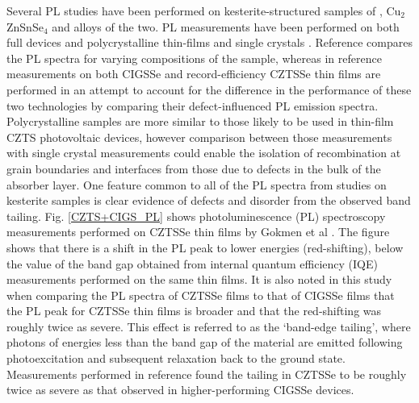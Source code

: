 \documentclass[11pt, twoside]{report}
\begin{document}
Several PL studies have been performed on kesterite-structured samples of {\CZTS}, Cu$_2$ZnSnSe$_4$ and alloys of the two. PL measurements have been performed on both full devices and polycrystalline thin-films \cite{band_tail, Gershon, Gershon_ref18, Romero, Miyamoto, Unold} and single crystals \cite{Halliday, Levcenko, Hones}. Reference  compares the PL spectra for varying compositions of the sample, whereas in reference  measurements on both CIGSSe and record-efficiency CZTSSe thin films are performed in an attempt to account for the difference in the performance of these two technologies by comparing their defect-influenced PL emission spectra. Polycrystalline samples are more similar to those likely to be used in thin-film CZTS photovoltaic devices, however comparison between those measurements with single crystal measurements could enable the isolation of recombination at grain boundaries and interfaces from those due to defects in the bulk of the absorber layer. 
One feature common to all of the PL spectra from studies on kesterite samples is clear evidence of defects and disorder from the observed band tailing. 
Fig. \ref{CZTS+CIGS_PL} shows photoluminescence (PL) spectroscopy measurements performed on CZTSSe thin films by Gokmen et al \cite{band_tail}. The figure shows that there is a shift in the PL peak to lower energies (red-shifting), below the value of the band gap obtained from internal quantum efficiency (IQE) measurements performed on the same thin films. It is also noted in this study when comparing the PL spectra of CZTSSe films to that of CIGSSe films that the PL peak for CZTSSe thin films is broader and that the red-shifting was roughly twice as severe. This effect is referred to as the `band-edge tailing', where photons of energies less than the band gap of the material are emitted following photoexcitation and subsequent relaxation back to the ground state. 
Measurements performed in reference  found the tailing in CZTSSe to be roughly twice as severe as that observed in higher-performing CIGSSe devices.
\end{document}
